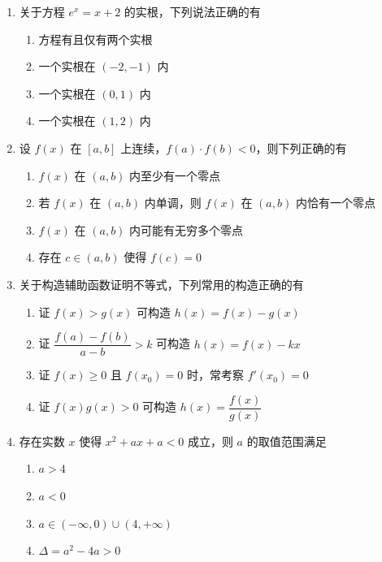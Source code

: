 \documentclass[12pt, a4paper]{ctexart}
\newcommand{\score}[1]{\hfill\makebox[2cm][l]{(#1分)}}
\begin{document}
\begin{enumerate}[resume]
\item 关于方程 $e^x = x + 2$ 的实根，下列说法正确的有\score{5}
\begin{enumerate}[label=\Alph*.]
\item 方程有且仅有两个实根
\item 一个实根在 $(-2, -1)$ 内
\item 一个实根在 $(0, 1)$ 内
\item 一个实根在 $(1, 2)$ 内
\end{enumerate}

\item 设 $f(x)$ 在 $[a, b]$ 上连续，$f(a) \cdot f(b) < 0$，则下列正确的有\score{5}
\begin{enumerate}[label=\Alph*.]
\item $f(x)$ 在 $(a, b)$ 内至少有一个零点
\item 若 $f(x)$ 在 $(a, b)$ 内单调，则 $f(x)$ 在 $(a, b)$ 内恰有一个零点
\item $f(x)$ 在 $(a, b)$ 内可能有无穷多个零点
\item 存在 $c \in (a, b)$ 使得 $f(c) = 0$
\end{enumerate}

\item 关于构造辅助函数证明不等式，下列常用的构造正确的有\score{5}
\begin{enumerate}[label=\Alph*.]
\item 证 $f(x) > g(x)$ 可构造 $h(x) = f(x) - g(x)$
\item 证 $\dfrac{f(a) - f(b)}{a - b} > k$ 可构造 $h(x) = f(x) - kx$
\item 证 $f(x) \geqslant 0$ 且 $f(x_0) = 0$ 时，常考察 $f'(x_0) = 0$
\item 证 $f(x)g(x) > 0$ 可构造 $h(x) = \dfrac{f(x)}{g(x)}$
\end{enumerate}

\item 存在实数 $x$ 使得 $x^2 + ax + a < 0$ 成立，则 $a$ 的取值范围满足\score{5}
\begin{enumerate}[label=\Alph*.]
\item $a > 4$
\item $a < 0$
\item $a \in (-\infty, 0) \cup (4, +\infty)$
\item $\Delta = a^2 - 4a > 0$
\end{enumerate}

\end{enumerate}
\end{document}
